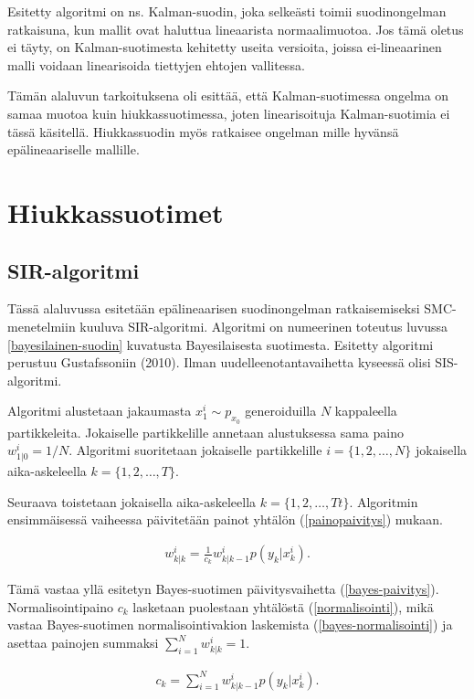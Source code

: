 \documentclass[
  12pt,
  a4paper, twoside]{book}
\begin{document}
Esitetty algoritmi on ns. Kalman-suodin, joka selkeästi toimii suodinongelman ratkaisuna, kun mallit ovat haluttua lineaarista normaalimuotoa. Jos tämä oletus ei täyty, on Kalman-suotimesta kehitetty useita versioita, joissa ei-lineaarinen malli voidaan linearisoida tiettyjen ehtojen vallitessa.

Tämän alaluvun tarkoituksena oli esittää, että Kalman-suotimessa ongelma on samaa muotoa kuin hiukkassuotimessa, joten linearisoituja Kalman-suotimia ei tässä käsitellä. Hiukkassuodin myös ratkaisee ongelman mille hyvänsä epälineaariselle mallille.

\chapter{Hiukkassuotimet} \label{hiukkassuotimet}

\section{SIR-algoritmi}

Tässä alaluvussa esitetään epälineaarisen suodinongelman ratkaisemiseksi SMC-menetelmiin kuuluva SIR-algoritmi. Algoritmi on numeerinen toteutus luvussa \ref{bayesilainen-suodin} kuvatusta Bayesilaisesta suotimesta. Esitetty algoritmi perustuu Gustafssoniin (2010). Ilman uudelleenotantavaihetta kyseessä olisi SIS-algoritmi.

Algoritmi alustetaan jakaumasta \(x_1^i\sim p_{x_0}\) generoiduilla \(N\) kappaleella partikkeleita. Jokaiselle partikkelille annetaan alustuksessa sama paino \(w_{1|0}^i=1/N\). Algoritmi suoritetaan jokaiselle partikkelille \(i=\{1,2,\ldots,N\}\) jokaisella aika-askeleella \(k=\{1,2,\ldots,T\}\).

Seuraava toistetaan jokaisella aika-askeleella \(k=\{1,2,\ldots,Tt\}\). Algoritmin ensimmäisessä vaiheessa päivitetään painot yhtälön (\ref{painopaivitys}) mukaan.

\begin{align}\label{painopaivitys}
w^i_{k|k}=\frac{1}{c_k}w^i_{k|k-1}p(y_k|x^i_k).
\end{align}

\noindent Tämä vastaa yllä esitetyn Bayes-suotimen päivitysvaihetta (\ref{bayes-paivitys}). Normalisointipaino \(c_k\) lasketaan puolestaan yhtälöstä (\ref{normalisointi}), mikä vastaa Bayes-suotimen normalisointivakion laskemista (\ref{bayes-normalisointi}) ja asettaa painojen summaksi \(\sum_{i=1}^Nw^i_{k|k}=1\).

\begin{align}\label{normalisointi}
c_k=\sum_{i=1}^{N}w_{k|{k-1}}^ip(y_k|x_k^i).
\end{align}
\end{document}
